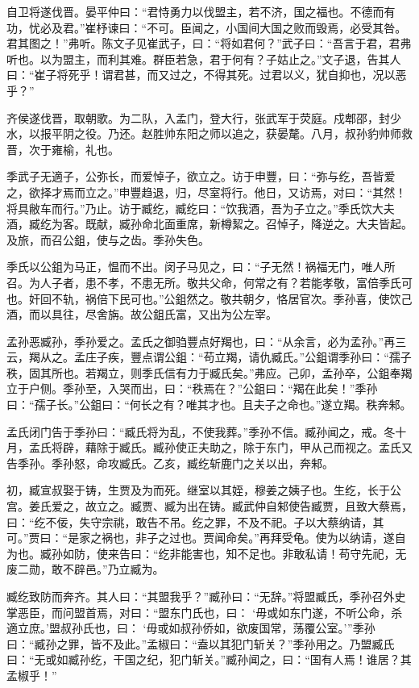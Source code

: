 \documentclass[a4paper,12pt,UTF8,twoside]{ctexbook}
\begin{document}
自卫将遂伐晋。晏平仲曰：“君恃勇力以伐盟主，若不济，国之福也。不德而有功，忧必及君。”崔杼谏曰：“不可。臣闻之，小国间大国之败而毁焉，必受其咎。君其图之！”弗听。陈文子见崔武子，曰：“将如君何？”武子曰：“吾言于君，君弗听也。以为盟主，而利其难。群臣若急，君于何有？子姑止之。”文子退，告其人曰：“崔子将死乎！谓君甚，而又过之，不得其死。过君以义，犹自抑也，况以恶乎？”

齐侯遂伐晋，取朝歌。为二队，入孟门，登大行，张武军于荧庭。戍郫邵，封少水，以报平阴之役。乃还。赵胜帅东阳之师以追之，获晏氂。八月，叔孙豹帅师救晋，次于雍榆，礼也。

季武子无適子，公弥长，而爱悼子，欲立之。访于申豐，曰：“弥与纥，吾皆爱之，欲择才焉而立之。”申豐趋退，归，尽室将行。他日，又访焉，对曰：“其然！将具敝车而行。”乃止。访于臧纥，臧纥曰：“饮我酒，吾为子立之。”季氏饮大夫酒，臧纥为客。既献，臧孙命北面重席，新樽絜之。召悼子，降逆之。大夫皆起。及旅，而召公鉏，使与之齿。季孙失色。

季氏以公鉏为马正，愠而不出。闵子马见之，曰：“子无然！祸福无门，唯人所召。为人子者，患不孝，不患无所。敬共父命，何常之有？若能孝敬，富倍季氏可也。奸回不轨，祸倍下民可也。”公鉏然之。敬共朝夕，恪居官次。季孙喜，使饮己酒，而以具往，尽舍旃。故公鉏氏富，又出为公左宰。

孟孙恶臧孙，季孙爱之。孟氏之御驺豐点好羯也，曰：“从余言，必为孟孙。”再三云，羯从之。孟庄子疾，豐点谓公鉏：“苟立羯，请仇臧氏。”公鉏谓季孙曰：“孺子秩，固其所也。若羯立，则季氏信有力于臧氏矣。”弗应。己卯，孟孙卒，公鉏奉羯立于户侧。季孙至，入哭而出，曰：“秩焉在？”公鉏曰：“羯在此矣！”季孙曰：“孺子长。”公鉏曰：“何长之有？唯其才也。且夫子之命也。”遂立羯。秩奔邾。

孟氏闭门告于季孙曰：“臧氏将为乱，不使我葬。”季孙不信。臧孙闻之，戒。冬十月，孟氏将辟，藉除于臧氏。臧孙使正夫助之，除于东门，甲从己而视之。孟氏又告季孙。季孙怒，命攻臧氏。乙亥，臧纥斩鹿门之关以出，奔邾。

初，臧宣叔娶于铸，生贾及为而死。继室以其姪，穆姜之姨子也。生纥，长于公宫。姜氏爱之，故立之。臧贾、臧为出在铸。臧武仲自邾使告臧贾，且致大蔡焉，曰：“纥不佞，失守宗祧，敢告不吊。纥之罪，不及不祀。子以大蔡纳请，其可。”贾曰：“是家之祸也，非子之过也。贾闻命矣。”再拜受龟。使为以纳请，遂自为也。臧孙如防，使来告曰：“纥非能害也，知不足也。非敢私请！苟守先祀，无废二勋，敢不辟邑。”乃立臧为。

臧纥致防而奔齐。其人曰：“其盟我乎？”臧孙曰：“无辞。”将盟臧氏，季孙召外史掌恶臣，而问盟首焉，对曰：“盟东门氏也，曰： ‘毋或如东门遂，不听公命，杀適立庶。’盟叔孙氏也，曰： ‘毋或如叔孙侨如，欲废国常，荡覆公室。’”季孙曰：“臧孙之罪，皆不及此。”孟椒曰：“盍以其犯门斩关？”季孙用之。乃盟臧氏曰：“无或如臧孙纥，干国之纪，犯门斩关。”臧孙闻之，曰：“国有人焉！谁居？其孟椒乎！”
\end{document}
